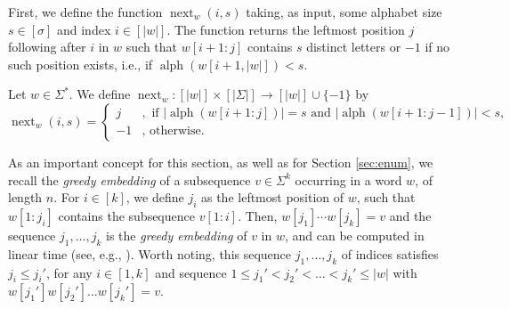 \documentclass[runningheads,UKenglish,cleveref, autoref, thm-restate]{llncs}
\DeclareMathOperator{\alphabet}{alph}
\DeclareMathOperator{\nextAlphPos}{next}
\begin{document}
First, we define the function $\nextAlphPos_w(i, s)$ taking, as input, some alphabet size $s \in [\sigma]$ and index $i \in [\vert w \vert]$. The function returns the leftmost position $j$ following after $i$ in $w$ such that $w[i+1:j]$ contains $s$ distinct letters or $-1$ if no such position exists, i.e., if $\alphabet(w[i + 1, \vert w \vert]) < s$. %
 \begin{definition}
     Let $w\in\Sigma^*$. We define $\nextAlphPos_w : [|w|]\times[|\Sigma|] \rightarrow [|w|]\cup\{-1\}$ by
     $$ \nextAlphPos_w(i,s) = 
     \begin{cases}  
         j   &, \text{ if } |\alphabet(w[i+1:j])| = s \text{ and } |\alphabet(w[i+1:j-1])| < s, \\
         -1  &, \text{ otherwise.}
     \end{cases}$$
 \end{definition}
 
As an important concept for this section, as well as for Section \ref{sec:enum}, we recall the {\em greedy embedding} of a subsequence $v \in \Sigma^k$ occurring in a word $w$, of length $n$. For $i\in [k]$, we define $j_i$ as the leftmost position of $w$, such that $w[1:j_i]$ contains the subsequence $v[1:i]$. Then, $w[j_1]\cdots w[j_k]=v$ and the sequence $j_1,\ldots,j_k$ is the {\em greedy embedding} of $v$ in $w$, and can be computed in linear time (see, e.g., \cite{DBLP:journals/fuin/KoscheKMS22}). Worth noting, this sequence $j_1,\ldots,j_k$ of indices satisfies $j_i \leq j_i'$, for any $i \in [1, k]$ and sequence $1 \leq j_1' < j_2' < \dots < j_k' \leq \vert w \vert$ with $w[j_1'] w[j_2'] \dots w[j_k'] = v$.


\end{document}
